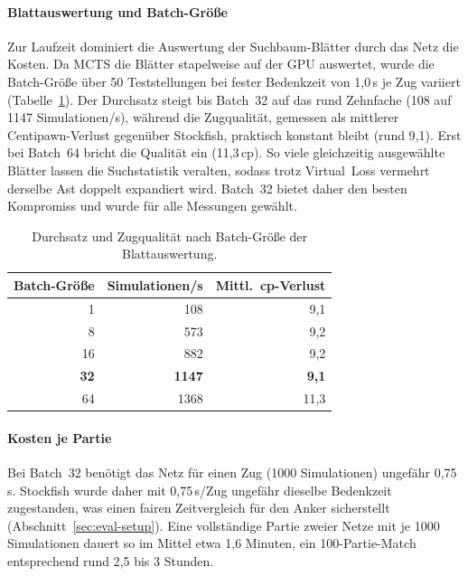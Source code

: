 \documentclass[
  a4paper, 12pt,
  parskip=half,
  headings=small,
  bibliography=totoc
]{scrartcl}
\begin{document}
\paragraph{Blattauswertung und Batch-Größe}
Zur Laufzeit dominiert die Auswertung der Suchbaum-Blätter durch das Netz die
Kosten. Da MCTS die Blätter stapelweise auf der GPU auswertet, wurde die
Batch-Größe über 50 Teststellungen bei fester Bedenkzeit von 1{,}0\,s je Zug
variiert (Tabelle~\ref{tab:mcts-batch}). Der Durchsatz steigt bis Batch~32 auf das
rund Zehnfache (108 auf 1147 Simulationen/s), während die Zugqualität, gemessen
als mittlerer Centipawn-Verlust gegenüber Stockfish, praktisch konstant bleibt
(rund 9{,}1). Erst bei Batch~64 bricht die Qualität ein (11{,}3\,cp). So viele
gleichzeitig ausgewählte Blätter lassen die Suchstatistik veralten, sodass trotz
Virtual~Loss vermehrt derselbe Ast doppelt expandiert wird. Batch~32 bietet daher
den besten Kompromiss und wurde für alle Messungen gewählt.

\begin{table}[htbp]
  \centering
  \small
  \begin{tabular}{rrr}
    \toprule
    Batch-Größe & Simulationen/s & Mittl.\ cp-Verlust \\
    \midrule
     1 &  108 &  9{,}1 \\
     8 &  573 &  9{,}2 \\
    16 &  882 &  9{,}2 \\
    \textbf{32} & \textbf{1147} &  \textbf{9{,}1} \\
    64 & 1368 & 11{,}3 \\
    \bottomrule
  \end{tabular}
  \caption{Durchsatz und Zugqualität nach Batch-Größe der Blattauswertung.}
  \label{tab:mcts-batch}
\end{table}

\paragraph{Kosten je Partie}
Bei Batch~32 benötigt das Netz für einen Zug (1000 Simulationen) ungefähr 0{,}75\,s.
Stockfish wurde daher mit 0{,}75\,s/Zug ungefähr dieselbe Bedenkzeit zugestanden,
was einen fairen Zeitvergleich für den Anker sicherstellt
(Abschnitt~\ref{sec:eval-setup}). Eine vollständige Partie zweier Netze mit je
1000 Simulationen dauert so im Mittel etwa 1{,}6 Minuten, ein 100-Partie-Match
entsprechend rund 2{,}5 bis 3 Stunden.
\end{document}

